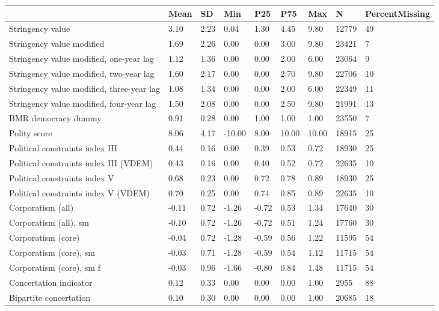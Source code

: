 
\begin{longtable}{lllllllll}
\toprule
  & Mean & SD & Min & P25 & P75 & Max & N & PercentMissing\\
\midrule
Stringency value & 3.10 & 2.23 & 0.04 & 1.30 & 4.45 & 9.80 & 12779 & 49\\
Stringency value modified & 1.69 & 2.26 & 0.00 & 0.00 & 3.00 & 9.80 & 23421 & 7\\
Stringency value modified, one-year lag & 1.12 & 1.36 & 0.00 & 0.00 & 2.00 & 6.00 & 23064 & 9\\
Stringency value modified, two-year lag & 1.60 & 2.17 & 0.00 & 0.00 & 2.70 & 9.80 & 22706 & 10\\
Stringency value modified, three-year lag & 1.08 & 1.34 & 0.00 & 0.00 & 2.00 & 6.00 & 22349 & 11\\
\addlinespace
Stringency value modified, four-year lag & 1.50 & 2.08 & 0.00 & 0.00 & 2.50 & 9.80 & 21991 & 13\\
BMR democracy dummy & 0.91 & 0.28 & 0.00 & 1.00 & 1.00 & 1.00 & 23550 & 7\\
Polity score & 8.06 & 4.17 & -10.00 & 8.00 & 10.00 & 10.00 & 18915 & 25\\
Political constraints index III & 0.44 & 0.16 & 0.00 & 0.39 & 0.53 & 0.72 & 18930 & 25\\
Political constraints index III (VDEM) & 0.43 & 0.16 & 0.00 & 0.40 & 0.52 & 0.72 & 22635 & 10\\
\addlinespace
Political constraints index V & 0.68 & 0.23 & 0.00 & 0.72 & 0.78 & 0.89 & 18930 & 25\\
Political constraints index V (VDEM) & 0.70 & 0.25 & 0.00 & 0.74 & 0.85 & 0.89 & 22635 & 10\\
Corporatism (all) & -0.11 & 0.72 & -1.26 & -0.72 & 0.53 & 1.34 & 17640 & 30\\
Corporatism (all), sm & -0.10 & 0.72 & -1.26 & -0.72 & 0.51 & 1.24 & 17760 & 30\\
Corporatism (core) & -0.04 & 0.72 & -1.28 & -0.59 & 0.56 & 1.22 & 11595 & 54\\
\addlinespace
Corporatism (core), sm & -0.03 & 0.71 & -1.28 & -0.59 & 0.54 & 1.12 & 11715 & 54\\
Corporatism (core), sm f & -0.03 & 0.96 & -1.66 & -0.80 & 0.84 & 1.48 & 11715 & 54\\
Concertation indicator & 0.12 & 0.33 & 0.00 & 0.00 & 0.00 & 1.00 & 2955 & 88\\
Bipartite concertation & 0.10 & 0.30 & 0.00 & 0.00 & 0.00 & 1.00 & 20685 & 18\\

\end{longtable}
